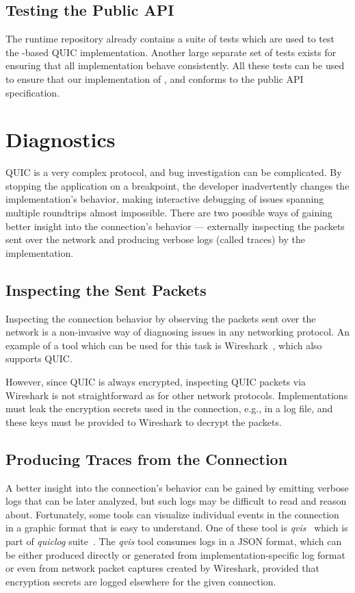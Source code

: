 \subsection{Testing the Public API}

The \dotnet{} runtime repository already contains a suite of tests which are used to test the
\libmsquic{}-based QUIC implementation. Another large separate set of tests exists for ensuring that
all  implementation behave consistently. All these tests can be used to ensure that
our implementation of \QuicListener{}, \QuicConnection{} and \QuicStream{} conforms to the public
API specification.

\section{Diagnostics}

QUIC is a very complex protocol, and bug investigation can be complicated. By stopping the
application on a breakpoint, the developer inadvertently changes the implementation's behavior,
making interactive debugging of issues spanning multiple roundtrips almost impossible. There are two
possible ways of gaining better insight into the connection's behavior --- externally inspecting the
packets sent over the network and producing verbose logs (called traces) by the implementation.

\subsection{Inspecting the Sent Packets}

Inspecting the connection behavior by observing the packets sent over the network is a non-invasive
way of diagnosing issues in any networking protocol. An example of a tool which can be used for this
task is Wireshark~\cite{web:wireshark}, which also supports QUIC.

However, since QUIC is always encrypted, inspecting QUIC packets via Wireshark is not
straightforward as for other network protocols. Implementations must leak the encryption secrets
used in the connection, e.g., in a log file, and these keys must be provided to Wireshark to decrypt
the packets.

\subsection{Producing Traces from the Connection}

A better insight into the connection's behavior can be gained by emitting verbose logs that can be
later analyzed, but such logs may be difficult to read and reason about. Fortunately, some tools can
visualize individual events in the connection in a graphic format that is easy to understand. One of
these tool is \textit{qvis}~\cite{web:qvis} which is part of \textit{quiclog}
suite~\cite{githubquiclog}. The \textit{qvis} tool consumes logs in a JSON format, which can be
either produced directly or generated from implementation-specific log format or even from network
packet captures created by Wireshark, provided that encryption secrets are logged elsewhere for the
given connection.

